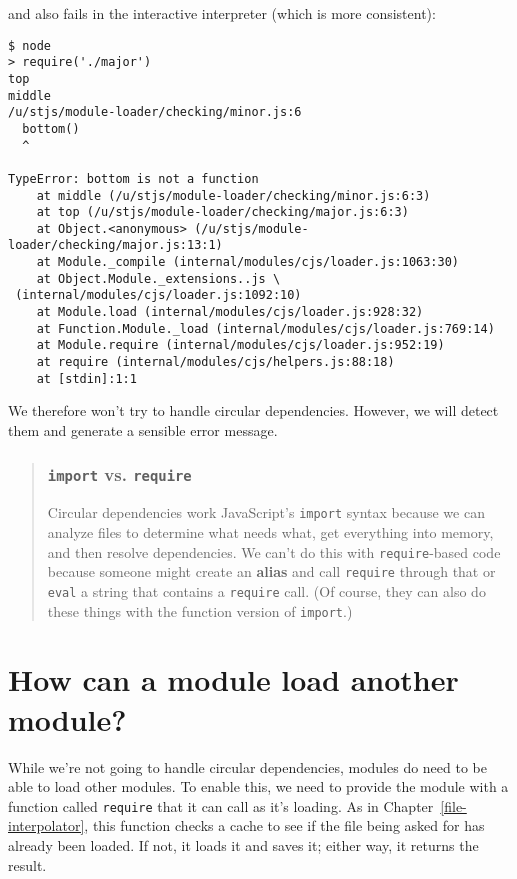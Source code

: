 \documentclass[krantzl]{krantz}
\newcommand{\chapref}[1]{Chapter~\ref{#1}}
\newcommand{\glossref}[1]{\textbf{#1}}
\newenvironment{callout}{\savenotes\begin{tBox}\begin{quotation}\toggletrue{inbox}\renewcommand{\thempfootnote}{\arabic{footnote}}}{\end{quotation}\vspace{\baselineskip}\end{tBox}\togglefalse{inbox}\spewnotes}
\begin{document}
\noindent and also fails in the interactive interpreter
(which is more consistent):


\begin{lstlisting}[frame=single,frameround=tttt]
$ node
> require('./major')
top
middle
/u/stjs/module-loader/checking/minor.js:6
  bottom()
  ^

TypeError: bottom is not a function
    at middle (/u/stjs/module-loader/checking/minor.js:6:3)
    at top (/u/stjs/module-loader/checking/major.js:6:3)
    at Object.<anonymous> (/u/stjs/module-loader/checking/major.js:13:1)
    at Module._compile (internal/modules/cjs/loader.js:1063:30)
    at Object.Module._extensions..js \
 (internal/modules/cjs/loader.js:1092:10)
    at Module.load (internal/modules/cjs/loader.js:928:32)
    at Function.Module._load (internal/modules/cjs/loader.js:769:14)
    at Module.require (internal/modules/cjs/loader.js:952:19)
    at require (internal/modules/cjs/helpers.js:88:18)
    at [stdin]:1:1
\end{lstlisting}



We therefore won't try to handle circular dependencies.
However,
we will detect them and generate a sensible error message.

\begin{callout}


\subsubsection*{\texttt{import} vs. \texttt{require}}


Circular dependencies work JavaScript's \texttt{import} syntax
because we can analyze files to determine what needs what,
get everything into memory,
and then resolve dependencies.
We can't do this with \texttt{require}-based code
because someone might create an \glossref{alias}
and call \texttt{require} through that
or \texttt{eval} a string that contains a \texttt{require} call.
(Of course, they can also do these things with the function version of \texttt{import}.)

\end{callout}

\section{How can a module load another module?}\label{module-loader-subload}


While we're not going to handle circular dependencies,
modules do need to be able to load other modules.
To enable this,
we need to provide the module with a function called \texttt{require}
that it can call as it's loading.
As in \chapref{file-interpolator},
this function checks a cache
to see if the file being asked for has already been loaded.
If not, it loads it and saves it;
either way, it returns the result.
\end{document}
